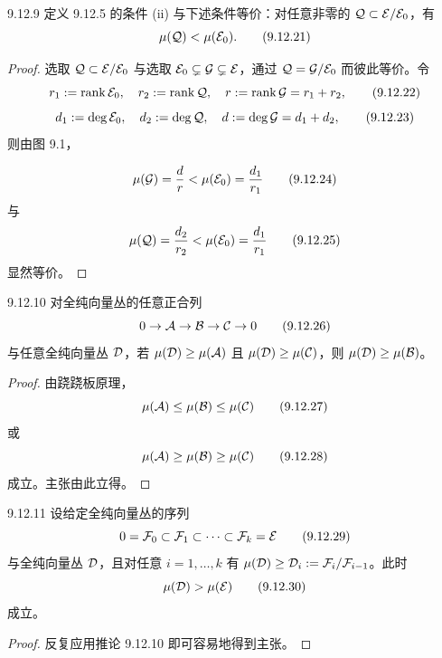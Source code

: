 \begin{corollary*}{9.12.9}
  定义 9.12.5 的条件 (ii) 与下述条件等价：对任意非零的 $\mathcal{Q}\subset\mathcal{E}/\mathcal{E}_0$，有
  \begin{equation}
    \mu(\mathcal{Q})<\mu(\mathcal{E}_0).
    \tag{9.12.21}
  \end{equation}
\end{corollary*}
\begin{proof}
  选取 $\mathcal{Q}\subset\mathcal{E}/\mathcal{E}_0$ 与选取 $\mathcal{E}_0\subsetneq\mathcal{G}\subsetneq\mathcal{E}$，通过 $\mathcal{Q}=\mathcal{G}/\mathcal{E}_0$ 而彼此等价。令
  \begin{equation}
    r_1:=\operatorname{rank}\mathcal{E}_0,\quad r_2:=\operatorname{rank}\mathcal{Q},\quad r:=\operatorname{rank}\mathcal{G}=r_1+r_2,
    \tag{9.12.22}
  \end{equation}
  \begin{equation}
    d_1:=\deg\mathcal{E}_0,\quad d_2:=\deg\mathcal{Q},\quad d:=\deg\mathcal{G}=d_1+d_2,
    \tag{9.12.23}
  \end{equation}
  则由图 9.1，


  \begin{equation}
    \mu(\mathcal{G})=\frac dr<\mu(\mathcal{E}_0)=\frac{d_1}{r_1}
    \tag{9.12.24}
  \end{equation}
  与
  \begin{equation}
    \mu(\mathcal{Q})=\frac{d_2}{r_2}<\mu(\mathcal{E}_0)=\frac{d_1}{r_1}
    \tag{9.12.25}
  \end{equation}
  显然等价。
\end{proof}

\begin{corollary*}{9.12.10}
  对全纯向量丛的任意正合列
  \begin{equation}
    0\to\mathcal{A}\to\mathcal{B}\to\mathcal{C}\to0
    \tag{9.12.26}
  \end{equation}
  与任意全纯向量丛 $\mathcal{D}$，若 $\mu(\mathcal{D})\ge\mu(\mathcal{A})$ 且 $\mu(\mathcal{D})\ge\mu(\mathcal{C})$，则 $\mu(\mathcal{D})\ge\mu(\mathcal{B})$。
\end{corollary*}
\begin{proof}
  由跷跷板原理，
  \begin{equation}
    \mu(\mathcal{A})\le\mu(\mathcal{B})\le\mu(\mathcal{C})
    \tag{9.12.27}
  \end{equation}
  或
  \begin{equation}
    \mu(\mathcal{A})\ge\mu(\mathcal{B})\ge\mu(\mathcal{C})
    \tag{9.12.28}
  \end{equation}
  成立。主张由此立得。
\end{proof}

\begin{corollary*}{9.12.11}
  设给定全纯向量丛的序列
  \begin{equation}
    0=\mathcal{F}_0\subset\mathcal{F}_1\subset\cdots\subset\mathcal{F}_k=\mathcal{E}
    \tag{9.12.29}
  \end{equation}
  与全纯向量丛 $\mathcal{D}$，且对任意 $i=1,\dots,k$ 有 $\mu(\mathcal{D})\ge\mathcal{D}_i:=\mathcal{F}_i/\mathcal{F}_{i-1}$。此时
  \begin{equation}
    \mu(\mathcal{D})>\mu(\mathcal{E})
    \tag{9.12.30}
  \end{equation}
  成立。
\end{corollary*}
\begin{proof}
  反复应用推论 9.12.10 即可容易地得到主张。
\end{proof}

